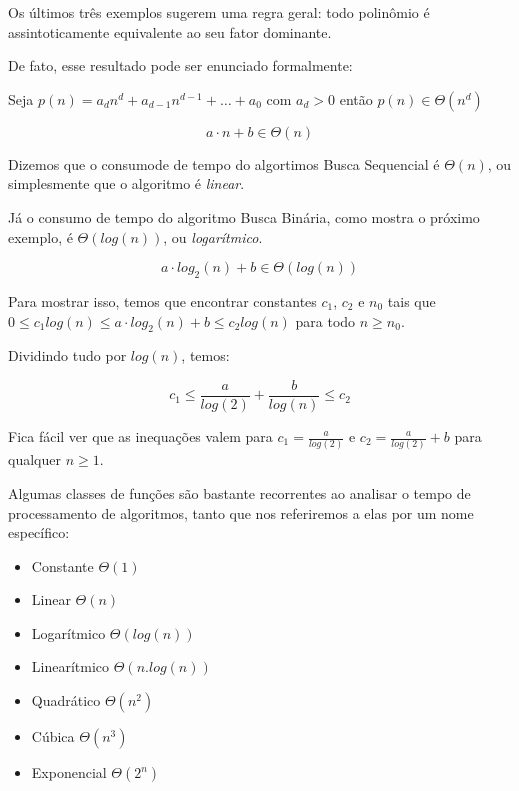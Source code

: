 Os últimos três exemplos sugerem uma regra geral: todo polinômio é assintoticamente equivalente ao seu fator dominante.

De fato, esse resultado pode ser enunciado formalmente:

\begin{theorem}
  Seja $p(n) = a_dn^d + a_{d-1}n^{d-1} + \dots + a_0$ com $a_d > 0$ então $p(n) \in \Theta(n^d)$
\end{theorem}

\begin{corollary}
  \begin{displaymath}
    a \cdot n + b \in \Theta(n)
  \end{displaymath}
\end{corollary}

Dizemos que o consumode de tempo do algortimos Busca Sequencial é $\Theta(n)$, ou simplesmente que o algoritmo é {\em linear}.

Já o consumo de tempo do algoritmo Busca Binária, como mostra o próximo exemplo, é $\Theta(log(n))$, ou {\em logarítmico}.

\begin{example}
  \begin{displaymath}
    a \cdot log_2(n) + b \in \Theta(log(n)) 
  \end{displaymath}

   Para mostrar isso, temos que encontrar constantes $c_1$, $c_2$ e $n_0$ tais que $0 \leq c_1 log(n) \leq a \cdot log_2(n) + b \leq c_2 log(n)$ para todo $n \geq n_0$.

   Dividindo tudo por $log(n)$, temos:

   \begin{displaymath}
     c_1 \leq \frac{a}{log(2)} + \frac{b}{log(n)} \leq c_2 
   \end{displaymath}

   Fica fácil ver que as inequações valem para $c_1 = \frac{a}{log(2)}$ e $c_2 = \frac{a}{log(2)} + b$ para qualquer $n \geq 1$.   
\end{example}

Algumas classes de funções são bastante recorrentes ao analisar o tempo de processamento de algoritmos, tanto que nos referiremos a elas por um nome específico:

\begin{itemize}
\item Constante $\Theta(1)$
\item Linear $\Theta(n)$
\item Logarítmico $\Theta(log(n))$
\item Linearítmico $\Theta(n.log(n))$
\item Quadrático $\Theta(n^2)$
\item Cúbica $\Theta(n^3)$
\item Exponencial $\Theta(2^n)$
\end{itemize}
